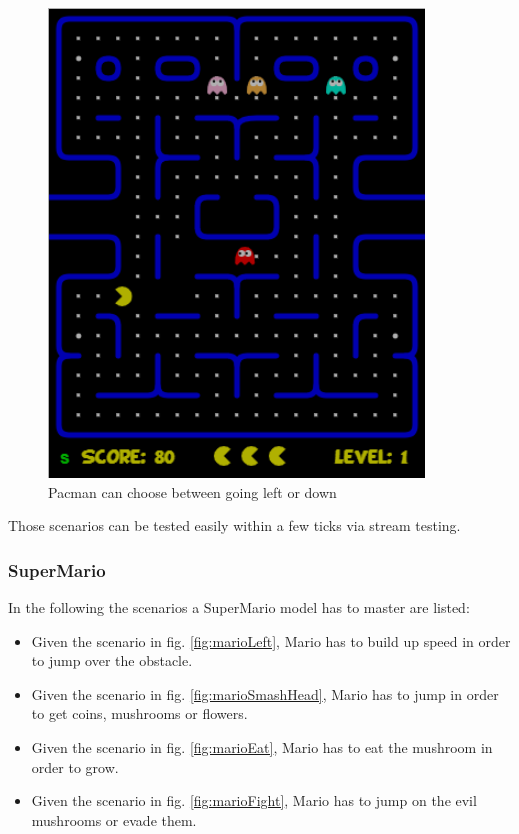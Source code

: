 \begin{figure}[!h]
	\centering
	\includegraphics[scale=0.55]{pictures/Pacman_Condition6.PNG}
	\caption{Pacman can choose between going left or down}
	\label{fig:pacmanCookie}
\end{figure}

Those scenarios can be tested easily within a few ticks via stream testing.

\subsubsection{SuperMario}
In the following the scenarios a SuperMario model has to master are listed:

\begin{itemize}
	\item Given the scenario in fig. \ref{fig:marioLeft}, Mario has to build up speed in order to jump over the obstacle.
	\item Given the scenario in fig. \ref{fig:marioSmashHead}, Mario has to jump in order to get coins, mushrooms or flowers.
	\item Given the scenario in fig. \ref{fig:marioEat}, Mario has to eat the mushroom in order to grow.
	\item Given the scenario in fig. \ref{fig:marioFight}, Mario has to jump on the evil mushrooms or evade them.
\end{itemize}

